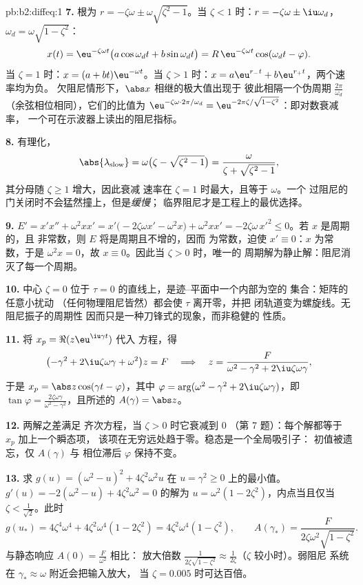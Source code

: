 \begin{solution}{pb:b2:diffeq:1}
\textbf{7.} 根为 $r = -\zeta\omega \pm
\omega\sqrt{\zeta^2-1}$。当 $\zeta < 1$ 时：$r = -\zeta\omega
\pm \iu\omega_d$，$\omega_d = \omega\sqrt{1-\zeta^2}$：
\[
x(t) = \eu^{-\zeta\omega t}\bigl(a\cos\omega_dt +
b\sin\omega_dt\bigr)
= R\,\eu^{-\zeta\omega t}\cos(\omega_dt - \varphi) .
\]
当 $\zeta = 1$ 时：$x = (a + bt)\eu^{-\omega t}$。当 $\zeta >
1$ 时：$x = a\eu^{r_-t} + b\eu^{r_+t}$，两个速率均为负。
欠阻尼情形下，$\abs x$ 相继的极大值出现于
彼此相隔一个伪周期 $\frac{2\pi}{\omega_d}$
（余弦相位相同），它们的比值为
$\eu^{-\zeta\omega\cdot2\pi/\omega_d} =
\eu^{-2\pi\zeta/\sqrt{1-\zeta^2}}$：即对数衰减率，
一个可在示波器上读出的阻尼指标。

\textbf{8.} 有理化，
\[
\abs{\lambda_{\mathrm{slow}}} = \omega\bigl(\zeta -
\sqrt{\zeta^2-1}\bigr)
= \frac{\omega}{\zeta + \sqrt{\zeta^2 - 1}} ,
\]
其分母随 $\zeta \geq 1$ 增大，因此衰减
速率在 $\zeta = 1$ 时最大，且等于 $\omega$。一个
过阻尼的门关闭时不会猛然撞上，但是\emph{缓慢}；
临界阻尼才是工程上的最优选择。

\textbf{9.} $E' = x'x'' + \omega^2xx' =
x'\bigl(-2\zeta\omega x' - \omega^2x\bigr) + \omega^2xx' =
-2\zeta\omega\,x'^2 \leq 0$。若 $x$ 是周期的，且
非常数，则 $E$ 将是周期且不增的，因而
为常数，迫使 $x' \equiv 0$：$x$ 为常数，于是
$\omega^2x = 0$，故 $x \equiv 0$。因此当 $\zeta > 0$ 时，唯一的
周期解为静止解：阻尼消灭了每一个周期。

\textbf{10.} 中心 $\zeta = 0$ 位于 $\tau =
0$ 的直线上，是迹–平面中一个内部为空的
集合：矩阵的任意小扰动
（任何物理阻尼皆然）都会使 $\tau$ 离开零，并把
闭轨道变为螺旋线。无阻尼振子的周期性
因而只是一种刀锋式的现象，而非稳健的
性质。

\textbf{11.} 将 $x_p = \Re(z\eu^{\iu\gamma t})$ 代入
方程，得
\[
\bigl(-\gamma^2 + 2\iu\zeta\omega\gamma +
\omega^2\bigr)z = F
\quad\Longrightarrow\quad
z = \frac{F}{\omega^2 - \gamma^2 + 2\iu\zeta\omega\gamma},
\]
于是 $x_p = \abs z\cos(\gamma t - \varphi)$，其中 $\varphi =
\arg(\omega^2 - \gamma^2 + 2\iu\zeta\omega\gamma)$，即\
$\tan\varphi = \frac{2\zeta\omega\gamma}{\omega^2 -
\gamma^2}$，且所述的 $A(\gamma) = \abs z$。

\textbf{12.} 两解之差满足
齐次方程，当 $\zeta > 0$ 时它衰减到 $0$
（第 7 题）：每个解都等于 $x_p$ 加上一个瞬态项，
该项在无穷远处趋于零。稳态是一个全局吸引子：
初值被遗忘，仅 $A(\gamma)$ 与
相位滞后 $\varphi$ 保持不变。

\textbf{13.} 求 $g(u) = (\omega^2 - u)^2 +
4\zeta^2\omega^2u$ 在 $u = \gamma^2 \geq 0$ 上的最小值。$g'(u) =
-2(\omega^2 - u) + 4\zeta^2\omega^2 = 0$ 的解为 $u = \omega^2(1 -
2\zeta^2)$，内点当且仅当 $\zeta < \frac{1}{\sqrt2}$。此时
\[
g(u_*) = 4\zeta^4\omega^4 + 4\zeta^2\omega^4(1 - 2\zeta^2)
= 4\zeta^2\omega^4(1 - \zeta^2),
\qquad
A(\gamma_*) = \frac{F}{2\zeta\omega^2\sqrt{1 - \zeta^2}} .
\]
与静态响应 $A(0) = \frac{F}{\omega^2}$ 相比：
放大倍数 $\frac{1}{2\zeta\sqrt{1-\zeta^2}} \approx
\frac{1}{2\zeta}$（$\zeta$ 较小时）。弱阻尼
系统在 $\gamma_* \approx \omega$ 附近会把输入放大，
当 $\zeta = 0.005$ 时可达百倍。


\end{solution}
